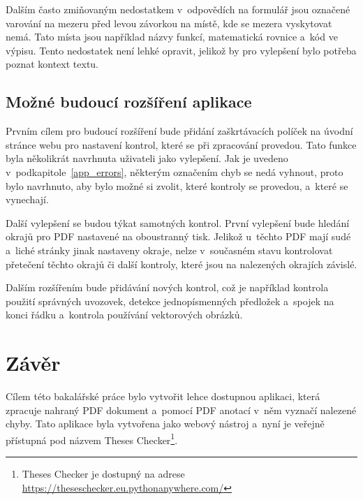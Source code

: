 Dalším často zmiňovaným nedostatkem v~odpovědích na formulář jsou označené
varování na mezeru před levou závorkou na místě, kde se mezera vyskytovat
nemá. Tato místa jsou například názvy funkcí, matematická rovnice a~kód
ve výpisu. Tento nedostatek není lehké opravit, jelikož by pro vylepšení
bylo potřeba poznat kontext textu.



\section{Možné budoucí rozšíření aplikace}
Prvním cílem pro budoucí rozšíření bude přidání zaškrtávacích políček na úvodní
stránce webu pro nastavení kontrol, které se při zpracování provedou. Tato funkce
byla několikrát navrhnuta uživateli jako vylepšení. Jak je uvedeno
v~podkapitole~\ref{app_errors}, některým označením chyb se nedá vyhnout, proto 
bylo navrhnuto, aby bylo možné si zvolit, které kontroly se provedou, a~které se
vynechají.

Další vylepšení se budou týkat samotných kontrol. První vylepšení bude hledání
okrajů pro PDF nastavené na oboustranný tisk. Jelikož u~těchto PDF mají sudé
a~liché stránky jinak nastaveny okraje, nelze v~současném stavu kontrolovat 
přetečení těchto okrajů či další kontroly, které jsou na nalezených okrajích
závislé.

Dalším rozšířením bude přidávání nových kontrol, což je například  kontrola
použití správných uvozovek, detekce jednopísmenných předložek a~spojek na
konci řádku a~kontrola používání vektorových obrázků.







\chapter{Závěr}
Cílem této bakalářské práce bylo vytvořit lehce dostupnou aplikaci, která zpracuje
nahraný PDF dokument a~pomocí PDF anotací v~něm vyznačí nalezené chyby. Tato
aplikace byla vytvořena jako webový nástroj a~nyní je veřejně
přístupná pod názvem Theses Checker\footnote{Theses Checker je dostupný na adrese
\href{https://theseschecker.eu.pythonanywhere.com/}{https://theseschecker.eu.pythonanywhere.com/}}.

